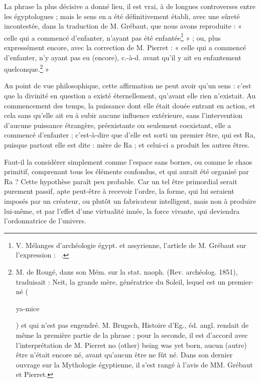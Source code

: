 \documentclass[a4paper, 11pt, oneside]{article}
\newcommand*\hieroAACS{}
\newcommand*\hieroAANC{}
\newcommand*\hieroABCM{}
\begin{document}
La phrase la plus décisive a donné lieu, il est vrai, à de longues controverses entre les égyptologues ; mais le sens en a été définitivement établi, avec une sûreté incontestée, dans la traduction de M. Grébaut, que nous avons reproduite : « celle qui a commencé d'enfanter, n'ayant pas été enfantée\footnote{V. Mélanges d'archéologie égypt. et assyrienne, l'article de M. Grébaut sur l'expression : $\hieroABCM\:\hieroAANC\:\hieroAACS$.} » ; ou, plus expressément encore, avec la correction de M. Pierret : « celle qui a commencé d'enfanter, n'y ayant pas eu (encore), c.-à-d. avant qu'il y ait eu enfantement quelconque.\footnote{M. de Rougé, dans son Mém. sur la stat. naoph. (Rev. archéolog. 1851), traduisait : Neit, la grande mère, génératrice du Soleil, lequel est un premier-né (\begin{coptic}ya-mice\end{coptic}) et qui n'est pas engendré. M. Brugsch, Histoire d'Eg., éd. angl. rendait de même la première partie de la phrase ; pour la seconde, il est d'accord avec l'interprétation de M. Pierret no (other) being was yet born, aucun (autre) être n'était encore né, avant qu'aucun être ne fût né. Dans son dernier ouvrage sur la Mythologie égyptienne, il s'est rangé à l'avis de MM. Grébaut et Pierret.} »

Au point de vue philosophique, cette affirmation ne peut avoir qu'un sens : c'est que la divinité en question a existé éternellement, qu'avant elle rien n'existait. Au commencement des temps, la puissance dont elle était douée entrant en action, et cela sans qu'elle ait eu à subir aucune influence extérieure, sans l'intervention d'aucune puissance étrangère, préexistante ou seulement coexistant, elle a commencé d'enfanter ; c'est-à-dire que d'elle est sorti un premier être, qui est Ra, puisque partout elle est dite : mère de Ra ; et celui-ci a produit les autres êtres.

Faut-il la considérer simplement comme l'espace sans bornes, ou comme le chaos primitif, comprenant tous les éléments confondus, et qui aurait été organisé par Ra ? Cette hypothèse paraît peu probable. Car un tel être primordial serait purement passif, apte peut-être à recevoir l'ordre, la forme, qui lui seraient imposés par un créateur, ou plutôt un fabricateur intelligent, mais non à produire lui-même, et par l'effet d'une virtualité innée, la force vivante, qui deviendra l'ordonnatrice de l'univers.
\end{document}
